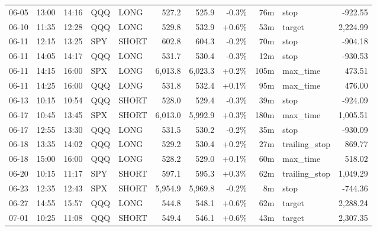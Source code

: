 \documentclass[11pt,a4paper,twoside]{article}
\begin{document}
\begin{center}
\begin{longtable}{>{\color{txtmain}}l l l l l r r r r >{\color{txtmain}}l r}
06-05 & 13:00 & 14:16 & QQQ & LONG & 527.2 & 525.9 & \textcolor{lossred}{-0.3\%} & 76m & stop & \textcolor{lossred}{-922.55} \\
06-10 & 11:35 & 12:28 & QQQ & LONG & 529.8 & 532.9 & \textcolor{wingreen}{+0.6\%} & 53m & target & \textcolor{wingreen}{2,224.99} \\
06-11 & 12:15 & 13:25 & SPY & SHORT & 602.8 & 604.3 & \textcolor{lossred}{-0.2\%} & 70m & stop & \textcolor{lossred}{-904.18} \\
06-11 & 14:05 & 14:17 & QQQ & LONG & 531.7 & 530.4 & \textcolor{lossred}{-0.3\%} & 12m & stop & \textcolor{lossred}{-930.53} \\
06-11 & 14:15 & 16:00 & SPX & LONG & 6,013.8 & 6,023.3 & \textcolor{wingreen}{+0.2\%} & 105m & max\_time & \textcolor{wingreen}{473.51} \\
06-11 & 14:25 & 16:00 & QQQ & LONG & 531.8 & 532.4 & \textcolor{wingreen}{+0.1\%} & 95m & max\_time & \textcolor{wingreen}{476.00} \\
06-13 & 10:15 & 10:54 & QQQ & SHORT & 528.0 & 529.4 & \textcolor{lossred}{-0.3\%} & 39m & stop & \textcolor{lossred}{-924.09} \\
06-17 & 10:45 & 13:45 & SPX & SHORT & 6,013.0 & 5,992.9 & \textcolor{wingreen}{+0.3\%} & 180m & max\_time & \textcolor{wingreen}{1,005.51} \\
06-17 & 12:55 & 13:30 & QQQ & LONG & 531.5 & 530.2 & \textcolor{lossred}{-0.2\%} & 35m & stop & \textcolor{lossred}{-930.09} \\
06-18 & 13:35 & 14:02 & QQQ & LONG & 529.2 & 530.4 & \textcolor{wingreen}{+0.2\%} & 27m & trailing\_stop & \textcolor{wingreen}{869.77} \\
06-18 & 15:00 & 16:00 & QQQ & LONG & 528.2 & 529.0 & \textcolor{wingreen}{+0.1\%} & 60m & max\_time & \textcolor{wingreen}{518.02} \\
06-20 & 10:15 & 11:17 & SPY & SHORT & 597.1 & 595.3 & \textcolor{wingreen}{+0.3\%} & 62m & trailing\_stop & \textcolor{wingreen}{1,049.29} \\
06-23 & 12:35 & 12:43 & SPX & SHORT & 5,954.9 & 5,969.8 & \textcolor{lossred}{-0.2\%} & 8m & stop & \textcolor{lossred}{-744.36} \\
06-27 & 14:55 & 15:57 & QQQ & LONG & 544.8 & 548.1 & \textcolor{wingreen}{+0.6\%} & 62m & target & \textcolor{wingreen}{2,288.24} \\
07-01 & 10:25 & 11:08 & QQQ & SHORT & 549.4 & 546.1 & \textcolor{wingreen}{+0.6\%} & 43m & target & \textcolor{wingreen}{2,307.35} \\

\end{longtable}
\end{center}
\end{document}
